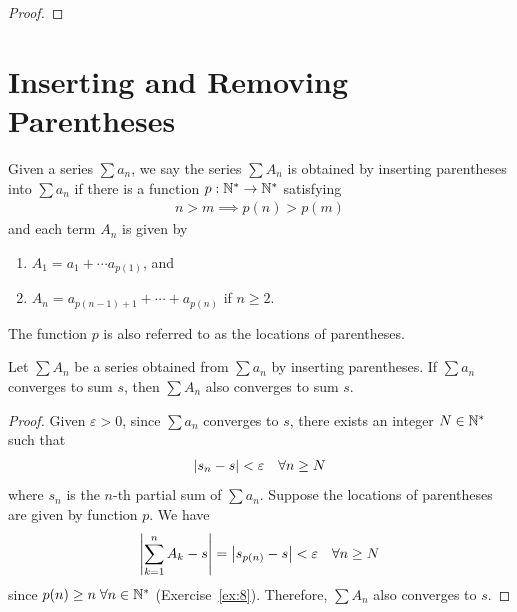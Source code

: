 \documentclass[thmcnt=section, 12pt]{my-elegantbook}
\begin{document}
\begin{proof}
\end{proof}


\section{Inserting and Removing Parentheses}


\begin{definition}
    Given a series $\sum a_n$, we say the series  $\sum A_n$ is obtained
    by inserting parentheses into  $\sum a_n$
    if there is a function $p: \mathbb{N}^\ast \to \mathbb{N}^\ast$ satisfying
    \begin{align*}
        n > m \implies p(n) > p(m)
    \end{align*}
    and each term $A_n$ is given by
    \begin{enumerate}
        \item $A_1 = a_1 + \cdots a_{p(1)}$, and
        \item  $A_n = a_{p(n-1)+1} + \cdots + a_{p(n)}$ if $n \geq 2$.
    \end{enumerate}
    The function $p$ is also referred to as the locations of parentheses.
\end{definition}

\begin{theorem}
    Let $\sum A_n$ be a series obtained from $\sum a_n$
    by inserting parentheses.
    If $\sum a_n$ converges to sum $s$,
    then $\sum A_n$ also converges to sum $s$.
\end{theorem}

\begin{proof}
    Given $\varepsilon > 0$, since $\sum a_n$ converges to $s$,
    there exists an integer $N \in \mathbb{N}^\ast$ such that
    \begin{align*}
        \left\lvert s_n - s \right\rvert < \varepsilon
        \quad \forall n \geq N
    \end{align*}
    where $s_n$ is the  $n$-th partial sum of $\sum a_n$.
    Suppose the locations of parentheses are given by function $p$.
    We have
    \begin{align*}
        \left\lvert \sum_{k=1}^n A_k - s \right\rvert
        = \left\lvert s_{p(n)} - s \right\rvert
        < \varepsilon
        \quad \forall n \geq N
    \end{align*}
    since $p(n) \geq n \; \forall n \in \mathbb{N}^\ast$ (Exercise~\ref{ex:8}).
    Therefore, $\sum A_n$ also converges to $s$.
\end{proof}
\end{document}
